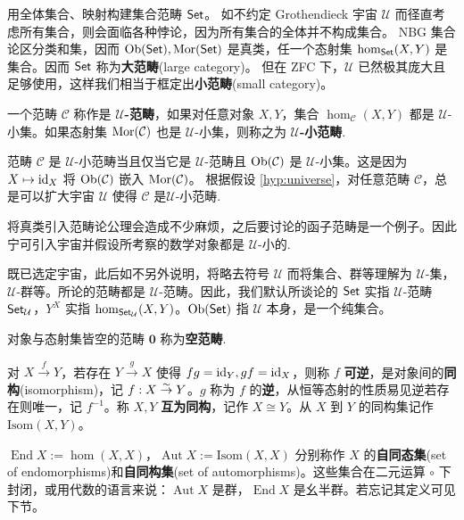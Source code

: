 用全体集合、映射构建集合范畴 $\mathsf{Set}$。
如不约定 Grothendieck 宇宙 $\mathcal{U}$ 而径直考虑所有集合，则会面临各种悖论，因为所有集合的全体并不构成集合。
NBG 集合论区分类和集，因而 $\operatorname{Ob}(\mathsf{Set}),\operatorname{Mor}(\mathsf{Set})$ 是真类，任一个态射集 $\hom_{\mathsf{Set}}(X,Y)$ 是集合。因而 $\mathsf{Set}$ 称为\textbf{大范畴}(large category)。
但在 ZFC 下，$\mathcal U$ 已然极其庞大且足够使用，这样我们相当于框定出\textbf{小范畴}(small category)。
\begin{definition}
  一个范畴 $\mathcal{C}$ 称作是 \textbf{$\mathcal{U}$-范畴}，如果对任意对象 $X, Y$，集合 $\hom_{\mathcal{C}}(X,Y)$ 都是 $\mathcal{U}$-小集。如果态射集 $\operatorname{Mor}(\mathcal{C})$ 也是 $\mathcal{U}$-小集，则称之为 \textbf{$\mathcal{U}$-小范畴}.
\end{definition}
\begin{remark}
	范畴 $\mathcal{C}$ 是 $\mathcal{U}$-小范畴当且仅当它是 $\mathcal{U}$-范畴且 $\operatorname{Ob}(\mathcal{C})$ 是 $\mathcal{U}$-小集。这是因为 $X \mapsto \mathrm{id}_X$ 将 $\operatorname{Ob}(\mathcal{C})$ 嵌入 $\operatorname{Mor}(\mathcal{C})$。
根据假设 \ref{hyp:universe}，对任意范畴 $\mathcal{C}$，总是可以扩大宇宙 $\mathcal{U}$ 使得 $\mathcal{C}$ 是$\mathcal{U}$-小范畴.
\end{remark}
将真类引入范畴论公理会造成不少麻烦，之后要讨论的函子范畴是一个例子。因此宁可引入宇宙并假设所考察的数学对象都是 $\mathcal{U}$-小的.

既已选定宇宙，此后如不另外说明，将略去符号 $\mathcal{U}$ 而将集合、群等理解为 $\mathcal{U}$-集，$\mathcal{U}$-群等。所论的范畴都是 $\mathcal{U}$-范畴。因此，我们默认所谈论的 $\mathsf{Set}$ 实指 $\mathcal{U}$-范畴 $\mathsf{Set}_\mathcal{U}$，$Y^X$ 实指 $\hom_{\mathsf{Set}_\mathcal{U}}(X,Y)$。$\operatorname{Ob}(\mathsf{Set})$ 指 $\mathcal{U}$ 本身，是一个纯集合。

\begin{definition}
	对象与态射集皆空的范畴 $\mathbf{0}$ 称为\textbf{空范畴}.
\end{definition}

\begin{definition}
    对 $X \xrightarrow{f} Y$，若存在 $Y \xrightarrow{g} X$ 使得 $f g = \mathrm{id}_Y,g f = \mathrm{id}_X$，则称 $f$ \textbf{可逆}，是对象间的\textbf{同构}(isomorphism)，记 $f: X \stackrel{\sim}{\rightarrow} Y$。$g$ 称为 $f$ 的\textbf{逆}，从恒等态射的性质易见逆若存在则唯一，记 $f^{-1}$。称 $X,Y$ \textbf{互为同构}，记作 $X\cong Y$。从 $X$ 到 $Y$ 的同构集记作 $\mathrm{Isom}(X, Y)$。

    $\operatorname{End} X := \hom(X, X)$，$\operatorname{Aut} X := \mathrm{Isom}(X, X)$ 分别称作 $X$ 的\textbf{自同态集}(set of endomorphisms)和\textbf{自同构集}(set of automorphisms)。这些集合在二元运算 $\circ$ 下封闭，或用代数的语言来说：$\operatorname{Aut} X$ 是群，$\operatorname{End} X$ 是幺半群。若忘记其定义可见下节。
\end{definition}

